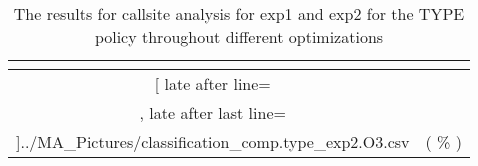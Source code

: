 \begin{table}[!htbp]
{\begin{tabular}{|c|c}
\multicolumn{1}{c}{}
	\\\midrule
	\csvreader[ late after line=\\, late after last line=\\\bottomrule]{../MA_Pictures/classification_comp.type_exp2.O3.csv}{
}
	{\csvcoliv ( \csvcolv \% ) & \csvcolvi( \csvcolvii\% )}%


    	\end{tabular}
}
		\caption {The results for callsite analysis for exp1 and exp2 for the TYPE policy throughout different optimizations}
		\label{tbl:CSexp12TYPE}
\end{table}


